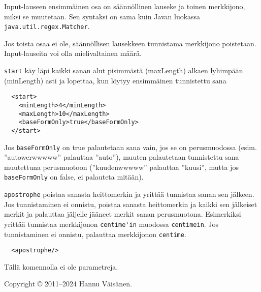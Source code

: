 \documentclass[12pt]{article}
\begin{document}
Input-lauseen ensimmäinen osa on säännöllinen lauseke ja toinen
merkkijono, miksi se muutetaan. Sen syntaksi on sama kuin Javan
luokassa \verb=java.util.regex.Matcher=.

Jos toista osaa ei ole, säännöllisen lausekkeen tunnistama merkkijono
poistetaan. Input-lauseita voi olla mielivaltainen määrä.




\bigskip
\verb=start= käy läpi kaikki sanan alut pisimmästä (maxLength) alkaen
lyhimpään (minLength) asti ja lopettaa, kun löytyy ensimmäinen
tunnistettu sana

\begin{verbatim}
  <start>
    <minLength>4</minLength>
    <maxLength>10</maxLength>
    <baseFormOnly>true</baseFormOnly>
  </start>
\end{verbatim}

Jos \verb=baseFormOnly= on true palautetaan sana vain, jos se on
perusmuodossa (esim. ''autowerwwwww'' palauttaa ''auto''), muuten
palautetaan tunnistettu sana muutettuna perusmuotoon (''kuudenwwwww''
palauttaa ''kuusi'', mutta jos \verb=baseFormOnly= on false, ei
palauteta mitään).




\bigskip

\verb=apostrophe= poistaa sanasta heittomerkin ja yrittää tunnistaa
sanan sen jälkeen. Jos tunnistaminen ei onnistu, poistaa sanasta
heittomerkin ja kaikki sen jälkeiset merkit ja palauttaa jäljelle
jääneet merkit sanan perusmuotona. Esimerkiksi yrittää tunnistaa
merkkijonon \verb=centime'in= muodossa \verb=centimein=. Jos
tunnistaminen ei onnistu, palauttaa merkkijonon \verb=centime=.


\begin{verbatim}
  <apostrophe/>
\end{verbatim}

Tällä komennolla ei ole parametreja.


\bigskip \noindent
Copyright © 2011--2024 Hannu Väisänen.
\end{document}
